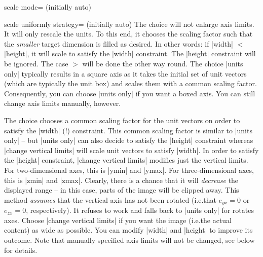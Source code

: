 \begin{pgfplotskey}{scale mode= (initially auto)}
\begin{pgfplotskey}{scale uniformly strategy= (initially auto)%
    }
        The choice  will not enlarge axis limits. It
        will only rescale the units. To this end, it chooses the scaling factor
        such that the \emph{smaller} target dimension is filled as desired. In
        other words: if |width| $<$ |height|, it will scale to satisfy the
        |width| constraint. The |height| constraint will be ignored. The case
        $>$ will be done the other way round. The choice |units only| typically
        results in a square axis as it takes the initial set of unit vectors
        (which are typically the unit box) and scales them with a common
        scaling factor. Consequently, you can choose |units only| if you want a
        boxed axis. You can still change axis limits manually, however.

        The choice  chooses a common
        scaling factor for the unit vectors on order to satisfy the |width| (!)
        constraint. This common scaling factor is similar to |units only| --
        but |units only| can also decide to satisfy the |height| constraint
        whereas  |change vertical limits| will scale unit vectors to satisfy
        |width|. In order to satisfy the |height| constraint,
        |change vertical limits| modifies just the vertical limits. For
        two-dimensional axes, this is |ymin| and |ymax|. For three-dimensional
        axes, this is |zmin| and |zmax|. Clearly, there is a chance that it
        will \emph{decrease} the displayed range -- in this case, parts of the
        image will be clipped away. This method \emph{assumes} that the
        vertical axis has not been rotated (i.e.\@ that $e_{yx}=0$ or
        $e_{zx}=0$, respectively). It refuses to work and falls back to
        |units only| for rotates axes. Choose |change vertical limits| if you
        want the image (i.e.\@ the actual content) as wide as possible. You can
        modify |width| and |height| to improve its outcome. Note that manually
        specified axis limits will not be changed, see below for details.


\end{pgfplotskey}
\end{pgfplotskey}
